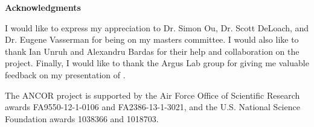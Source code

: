 
\newpage
\vspace*{0.9cm}
\begin{center}
{\bf \Huge Acknowledgments}
\end{center}

\setlength{\baselineskip}{0.8cm}



I would like to express my appreciation to Dr. Simon Ou, Dr. Scott DeLoach, and Dr. Eugene Vasserman for being on my masters committee. I would also like to thank Ian Unruh and Alexandru Bardas for their help and collaboration on the \ancor{} project. Finally, I would like to thank the Argus Lab group for giving me valuable feedback on my presentation of \projectName{}.

The ANCOR project is supported by the Air Force Office of Scientific Research awards FA9550-12-1-0106 and FA2386-13-1-3021, and the U.S. National Science Foundation awards 1038366 and 1018703.
